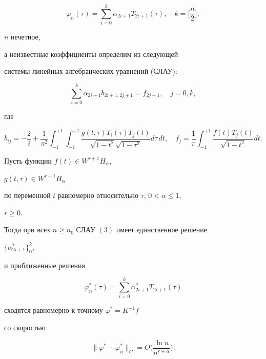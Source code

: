 \begin{equation}


\varphi_n(\tau) = \sum_{i=0}^{k}


\alpha_{2i+1} T_{2i+1}(\tau),\quad k=\bigg[\frac{n}{2}\bigg],


\end{equation}


$n$ нечетное,


а неизвестные коэффициенты определим из следующей


системы линейных алгебраических уравнений (СЛАУ):


\begin{equation}


\sum_{i=0}^{k} \alpha_{2i+1} b_{2i+1,2j+1} = f_{2j+1},\quad


j=\overline{0,k},


\end{equation}


где


$$


b_{ij} = -\frac{2}{i} +


\frac{1}{\pi^2}\int^{+1}_{-1}\int^{+1}_{-1}


\frac{g(t,\tau) T_{i}(\tau) T_{j}(t)}


{\sqrt{1-t^2}\sqrt{1-\tau^2}}d\tau\, dt,\quad


f_j =\frac{1}{\pi}\int^{+1}_{-1}


\frac{f(t) T_{j}(t)}{\sqrt{1-t^2}}dt.


$$





\begin{thm}


Пусть функции $f(t) \in W^{r+1} H_{\alpha}$,


$g(t,\tau) \in W^{r+1} H_{\alpha}$


по переменной $t$ равномерно относительно $\tau$, $0<\alpha\leq 1$,


$r\geq 0$.


Тогда при всех $n \geq n_0$ СЛАУ $(3)$ имеет единственное решение


$\{ \alpha_{2i+1}^*\}_{0}^{k}$,


и приближенные решения


$$


\varphi_n^*(\tau) =\sum_{i=0}^{k}


\alpha_{2i+1}^* T_{2i+1}(\tau)


$$


сходятся равномерно к точному $ \varphi^* = K^{-1} f$


со скоростью


$$


\|\varphi^* - \varphi_{n}^*\|_C= O\bigg(\frac{\ln n}{n^{r+\alpha}}\bigg).


$$


\end{thm}





